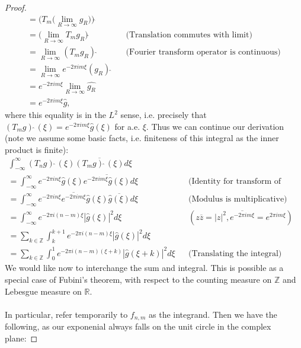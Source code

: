 \documentclass[12pt]{article}
\newenvironment{ex}[2][Exercise]{\begin{trivlist}
\item[\hskip \labelsep {\bfseries #1}\hskip \labelsep {\bfseries #2.}]}{\end{trivlist}}
\begin{document}
\begin{ex}{12}
\begin{proof}
\begin{align*}
            = \Big (T_m \Big (\underset{R \rightarrow \infty}{\lim} g_R \Big)\Big)\hat{\;} \\
            = \Big ( \underset{R \rightarrow \infty}{\lim} T_mg_R \Big)\hat{\;} && \text{(Translation commutes with limit)} \\ 
            = \underset{R \rightarrow \infty}{\lim} (T_mg_R)\hat{\;} && \text{(Fourier transform operator is continuous)} \\
            = \underset{R \rightarrow \infty}{\lim} e^{-2\pi i m\xi}(g_R)\hat{\;} \\
            = e^{-2\pi i m\xi} \underset{R \rightarrow \infty}{\lim} \hat{g_R} \\
            = e^{-2\pi i m\xi}\hat{g},
        \end{align*}
        where this equality is in the $L^2$ sense, i.e. precisely that $(T_mg)\hat{\;}(\xi) = e^{-2\pi i m \xi}\hat{g}(\xi)$ for a.e. $\xi$. Thus we can continue our derivation (note we assume some basic facts, i.e. finiteness of this integral as the inner product is finite):
        \begin{align*}
            \int_{-\infty}^\infty (T_ng)\hat{\;}(\xi)\overline{(T_mg)\hat{\;}(\xi)} d\xi \\
            = \int_{-\infty}^\infty e^{-2\pi in\xi}\hat{g}(\xi)\overline{e^{-2\pi im\xi}\hat{g}(\xi)} d\xi && \text{(Identity for transform of translation)} \\
            = \int_{-\infty}^\infty e^{-2\pi in\xi}\overline{e^{-2\pi im\xi}}\hat{g}(\xi)\overline{\hat{g}(\xi)} d\xi && \text{(Modulus is multiplicative)} \\
            = \int_{-\infty}^\infty e^{-2\pi i(n - m)\xi}|\hat{g}(\xi)|^2 d\xi && (z\overline{z} = |z|^2, \overline{e^{-2\pi im\xi}} = e^{2\pi im\xi}) \\
            = \sum_{k \in \mathbb{Z}} \int_{k}^{k + 1} e^{-2\pi i(n - m)\xi}|\hat{g}(\xi)|^2 d\xi \\
            = \sum_{k \in \mathbb{Z}} \int_0^1 e^{{-2\pi i}(n - m)(\xi + k)}|\hat{g}(\xi + k)|^2 d\xi && \text{(Translating the integral)}
        \end{align*} 
        We would like now to interchange the sum and integral. This is possible as a special case of Fubini's theorem, with respect to the counting measure on $\mathbb{Z}$ and Lebesgue measure on $\mathbb{R}$. \\ \\
        In particular, refer temporarily to $f_{n,m}$ as the integrand. Then we have the following, as our exponenial always falls on the unit circle in the complex plane:

\end{proof}
\end{ex}
\end{document}
